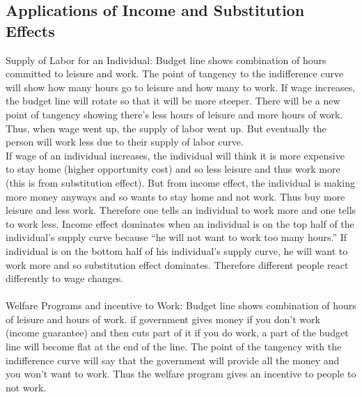 \documentclass[12pt]{article}
\begin{document}
\subsection{Applications of Income and Substitution Effects}
Supply of Labor for an Individual: Budget line shows combination of hours committed to leisure and work. The point of tangency to the indifference curve will show how many hours go to leisure and how many to work. If wage increases, the budget line will rotate so that it will be more steeper. There will be a new point of tangency showing there's less hours of leisure and more hours of work. Thus, when wage went up, the supply of labor went up. But eventually the person will work less due to their supply of labor curve. \\
If wage of an individual increases, the individual will think it is more expensive to stay home (higher opportunity cost) and so less leisure and thus work more (this is from substitution effect). But from income effect, the individual is making more money anyways and so wants to stay home and not work. Thus buy more leisure and less work. Therefore one tells an individual to work more and one tells to work less. Income effect dominates when an individual is on the top half of the individual's supply curve because ``he will not want to work too many hours.'' If individual is on the bottom half of his individual's supply curve, he will want to work more and so substitution effect dominates. Therefore different people react differently to wage changes. \\~\\
Welfare Programs and incentive to Work: Budget line shows combination of hours of leisure and hours of work. if government gives money if you don't work (income guarantee) and then cuts part of it if you do work, a part of the budget line will become flat at the end of the line. The point of the tangency with the indifference curve will say that the government will provide all the money and you won't want to work. Thus the welfare program gives an incentive to people to not work. 
\end{document}
